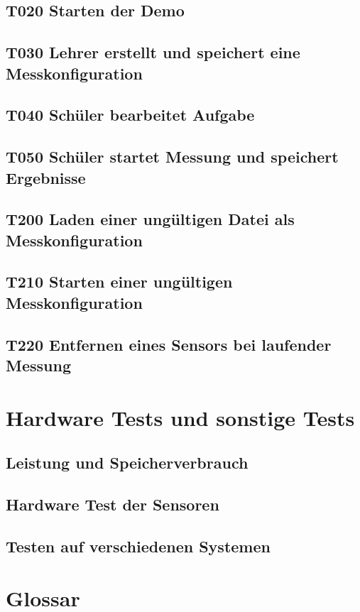 \documentclass[parskip=full]{scrartcl}
\begin{document}
\subsection{\textbf{T020} Starten der Demo}

\subsection{\textbf{T030} Lehrer erstellt und speichert eine Messkonfiguration}

\subsection{\textbf{T040} Schüler bearbeitet Aufgabe}

\subsection{\textbf{T050} Schüler startet Messung und speichert Ergebnisse}

\subsection{\textbf{T200} Laden einer ungültigen Datei als Messkonfiguration}

\subsection{\textbf{T210} Starten einer ungültigen Messkonfiguration}

\subsection{\textbf{T220} Entfernen eines Sensors bei laufender Messung}

\clearpage
\section{Hardware Tests und sonstige Tests} \label{sonstiges}


\subsection{Leistung und Speicherverbrauch}


\subsection{Hardware Test der Sensoren}


\subsection{Testen auf verschiedenen Systemen}

\clearpage
\section{Glossar}\label{glossar}

\renewcommand*{\glossarysection}[2][]{}	%
\printnoidxglossaries				%
\end{document}
